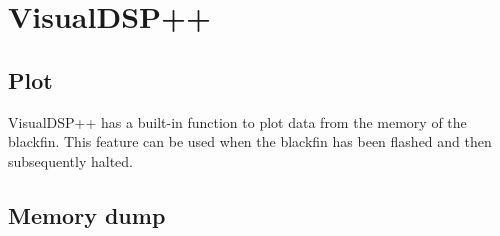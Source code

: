 \section{VisualDSP++}
\subsection{Plot}
VisualDSP++ has a built-in function to plot data from the memory of the blackfin. This feature can be used when the blackfin has been flashed and then subsequently halted. 
\subsection{Memory dump}
